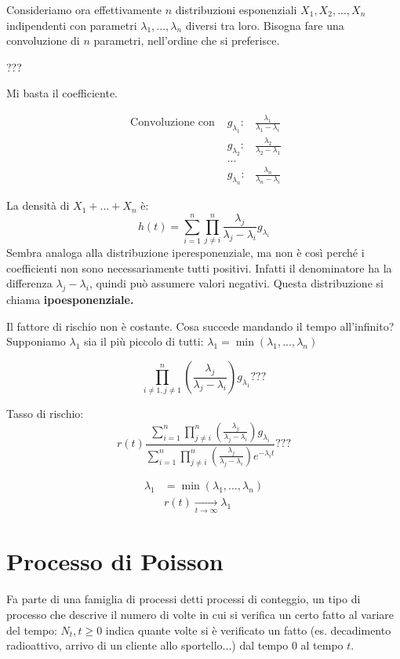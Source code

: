 \documentclass[a4paper,12pt]{book}
\begin{document}
Consideriamo ora effettivamente $ n $ distribuzioni esponenziali $ X_1, X_2, ..., X_n $ indipendenti con parametri $ \lambda_1, ..., \lambda_n $ diversi tra loro. Bisogna fare una convoluzione di $ n $ parametri, nell'ordine che si preferisce. 

??? %

Mi basta il coefficiente. 

$$ \begin{array}{ccc} %
 \text{ Convoluzione con } & g_{\lambda_1}: & \frac{\lambda_1}{\lambda_1 - \lambda_i} \\
 & g_{\lambda_2} : & \frac{\lambda_2}{\lambda_2  - \lambda_1} \\
 & ... & \\
 & g_{\lambda_n}: & \frac{\lambda_n}{\lambda_n - \lambda_i}
\end{array}$$


La densità di $ X_1 + ... + X_n $ è:
$$ h(t) = \sum_{i = 1}^n \prod_{j \ne i}^{n} \frac{\lambda_j}{\lambda_j - \lambda_i} g_{\lambda_i}$$
Sembra analoga alla distribuzione iperesponenziale, ma non è così perché i coefficienti non sono necessariamente tutti positivi. Infatti il denominatore ha la differenza $ \lambda_j - \lambda_i $, quindi può assumere valori negativi. Questa distribuzione si chiama \textbf{ipoesponenziale.} %

Il fattore di rischio non è costante. Cosa succede mandando il tempo all'infinito? Supponiamo $\lambda_1$ sia il più piccolo di tutti: $\lambda_1 = \min(\lambda_1, ..., \lambda_n)$

$$ \prod_{i \ne 1, j\ne 1}^{n} \left(\frac{\lambda_j}{\lambda_j - \lambda_i}\right) g_{\lambda_1} ??? $$ %

Tasso di rischio:
$$ r(t) \frac{\sum_{i=1}^{n}\prod_{j\ne i}^{n} \left(\frac{\lambda_j}{\lambda_j - \lambda_i}\right)g_{\lambda_i}}{\sum_{i=1}^{n}\prod_{j\ne i}^{n} \left(\frac{\lambda_j}{\lambda_j - \lambda_i}\right) e^{-\lambda_i t}} ??? $$%

\begin{align*}
	\lambda_1 & = \min(\lambda_1, ..., \lambda_n) \\
	& r(t) \underset{t \to \infty}{\longrightarrow} \lambda_1
\end{align*}

\chapter{Processo di Poisson}
Fa parte di una famiglia di processi detti processi di conteggio, un tipo di processo che descrive il numero di volte in cui si verifica un certo fatto al variare del tempo: $ N_t, t \ge 0 $ indica quante volte si è verificato un fatto (es. decadimento radioattivo, arrivo di un cliente allo sportello...) dal tempo 0 al tempo $ t $.
\end{document}
